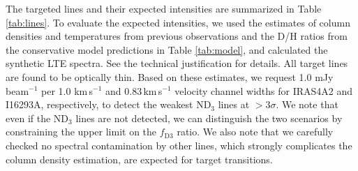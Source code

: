 \documentclass[12pt,a4paper]{article}  %
\begin{document}
The targeted lines and their expected intensities are summarized in Table \ref{tab:lines}. To evaluate the expected intensities, we used the estimates of column densities and temperatures from previous observations and the D/H ratios from the conservative model predictions in Table \ref{tab:model}, and calculated the synthetic LTE spectra. See the technical justification for details. 
All target lines are found to be optically thin. Based on these estimates, we request 1.0 mJy beam$^{-1}$ per 1.0 km\,s$^{-1}$ and 0.83\,km\,s$^{-1}$ velocity channel widths for IRAS4A2 and I16293A, respectively, to detect the weakest ND$_3$ lines at $>$3$\sigma$. 
We note that even if the ND$_3$ lines are not detected, we can distinguish the two scenarios by constraining the upper limit on the $f_\mathrm{D3}$ ratio. We also note that we carefully checked no spectral contamination by other lines, which strongly complicates the column density estimation, are expected for target transitions.
\end{document}
